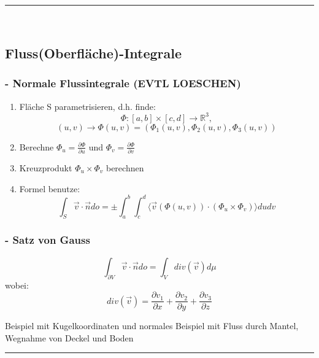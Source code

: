 \documentclass[6pt]{article}
\begin{document}
\begin{multicols*}{3}
		
		\vspace{-2mm}
  		\noindent\textcolor{gray}{\rule{9cm}{0.1pt}}
		\vspace{-2mm}\\
		
		\subsection*{Fluss(Oberfl{\"a}che)-Integrale}
		
		\subsubsection*{- Normale Flussintegrale (EVTL LOESCHEN)}

		\begin{enumerate}
			\item Fl{\"a}che S parametrisieren, d.h. finde:
						\[
								\Phi: [a,b] \times [c,d] \rightarrow \mathbb{R}^3, 
						\]
						\[
								(u,v) \rightarrow \Phi(u,v) = (\Phi_1(u,v), \Phi_2(u,v), \Phi_3(u,v))
						\]
			\item Berechne $\Phi_u = \frac{\partial \Phi}{\partial u}$ und $\Phi_v = \frac{\partial \Phi}{\partial v}$
			\item Kreuzprodukt $\Phi_u \times \Phi_v$ berechnen
			\item Formel benutze:
						\[
								\int_{S} \vec{v} \cdot \vec{n}do = \pm \int_{a}^{b} \int_{c}^{d} \langle\vec{v}(\Phi(u,v)) \cdot (\Phi_u \times \Phi_v)\rangle dudv
						\]
		\end{enumerate}



		\subsubsection*{- Satz von Gauss}
		\[
				\int_{\partial V} \vec{v} \cdot \vec{n}do = \int_{V} div(\vec{v}) d\mu
		\]
		wobei:
		\[
				div(\vec{v}) = \frac{\partial v_1}{\partial x} + \frac{\partial v_2}{\partial y} + \frac{\partial v_3}{\partial z}
		\]
		
		Beispiel mit Kugelkoordinaten und normales
		Beispiel mit Fluss durch Mantel, Wegnahme von Deckel und Boden

	
		\vspace{-2mm}
  		\noindent\textcolor{gray}{\rule{9cm}{0.1pt}}
		\vspace{-2mm}\\	
		

\end{multicols*}
\end{document}
